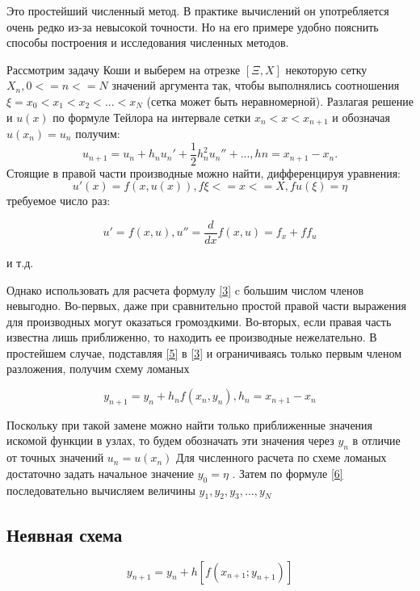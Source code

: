 \documentclass[12pt,a4paper]{scrartcl}
\begin{document}
	Это простейший численный метод. В практике вычислений он употребляется
	очень редко из-за невысокой точности. Но на его примере удобно пояснить
	способы построения и исследования численных методов.
	
	Рассмотрим задачу Коши и выберем на отрезке $[\Xi, X]$ некоторую сетку {$X_n, 0 <= n <= N$} значений аргумента так, чтобы выполнялись соотношения $\xi = x_0 < x_1 < x_2 < ... < x_N$  (сетка может быть неравномерной). Разлагая решение и $u(x)$ по формуле Тейлора на интервале сетки $x_n < x < x_{n + 1}$ и обозначая $u(x_n) = u_n$ получим:
	\begin{equation} \label{3}
		u_{n + 1} = u_n + h_nu_n' + \frac{1}{2}h_n^2u_n'' + ...,  hn = x_{n + 1} - x_n.
	\end{equation}
	Стоящие в правой части производные можно найти, дифференцируя уравнения:
	\begin{equation} \label{4}
		u'(x) = f(x, u(x)), f\xi <= x <= X, fu(\xi) = \eta 
	\end{equation} требуемое число раз:
	
	\begin{equation} \label{5}
		u' = f(x, u), u'' = \frac{d}{dx}f(x,u) = f_x + ff_u
	\end{equation}
	
	и т.д.
	
	Однако использовать для расчета формулу \ref{3} c большим числом членов невыгодно. Во-первых, даже при сравнительно простой правой части 
	выражения для производных могут оказаться громоздкими. Во-вторых, если правая часть известна лишь приближенно, то находить ее производные нежелательно. 
	В простейшем случае, подставляя \ref{5} в \ref{3} и
	ограничиваясь только первым членом разложения, получим схему ломаных

	
	\begin{equation} \label{6}
		y_{n + 1} = y_n + h_nf(x_n, y_n), h_n = x_{n + 1} - x_n
	\end{equation}
	
	Поскольку при такой замене можно найти только приближенные значения искомой функции в узлах, то будем обозначать эти значения через $y_n$ в отличие от точных значений $u_n = u(x_n)$ Для численного расчета по схеме ломаных
	достаточно задать начальное значение $y_0 = \eta$ . Затем по формуле \ref{6} последовательно вычисляем величины $y_1, y_2, y_3, ..., y_N$
	
	\subsection{Неявная схема}
	\begin{equation} \label{7}
		y_{n+1} = y_n + h[f(x_{n+1}; y_{n+1})]
	\end{equation}
	
\end{document}

